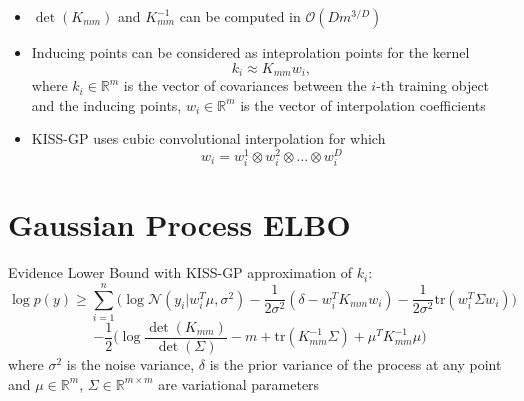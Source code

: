 \documentclass[a0,portrait]{a0poster}
\newcommand{\R}{\mathbb{R}}
\newcommand{\N}{\mathcal{N}}
\newcommand{\bigO}{\mathcal{O}}
\newcommand{\tr}{\mbox{tr}}
\begin{document}
\begin{multicols}{2}
\begin{minipage}[b]{0.45\linewidth}
  \vspace{-1cm}
\end{minipage}
\begin{minipage}[b]{0.5\linewidth}
  \begin{center}
    \centering
    \scalebox{1.25}{
      
    }
  \end{center}
\end{minipage}
    
    \begin{itemize}
      \item $\det(K_{mm})$ and $K_{mm}^{-1}$ can be computed in $\bigO(D m^{3/D})$
      \item Inducing points can be considered as inteprolation points for the
        kernel
        \[
          k_i \approx K_{mm} w_i,
        \]
      where $k_i \in \R^m$ is the vector of covariances between the $i$-th training
      object and the inducing points, $w_i\in \R^{m}$ is the vector of interpolation coefficients

      \item KISS-GP uses cubic convolutional interpolation for which 
        \[
          w_i = w_i^1 \otimes w_i^2 \otimes \ldots \otimes w_i^D
        \]
\end{itemize}

\section*{\LARGE \color{NavyBlue}Gaussian Process ELBO}
    
Evidence Lower Bound \citep{hensman2013} with KISS-GP approximation of $k_i$:
\[
  \log p(y) \ge \sum_{i=1}^n \bigg(\log \N (y_i | w_i^T \mu, \sigma^2) - 
  \frac 1 {2 \sigma^2} (\delta - w_i^T K_{mm} w_i) - \frac 1 {2 \sigma^2} 
    \tr (w_i^T \Sigma w_i)\bigg)
\]
\[
  - \frac 1 2 \bigg(\log \frac {\det (K_{mm})} {\det (\Sigma)} - m + \tr(K_{mm}^{-1} \Sigma)
  + \mu^T K_{mm}^{-1}\mu \bigg)
\]
where
$\sigma^2$ is the noise variance, $\delta$ is the prior variance of the process at any point
and $\mu \in \R^m$, $\Sigma \in \R^{m \times m}$ are variational parameters

\end{multicols}
\end{document}
